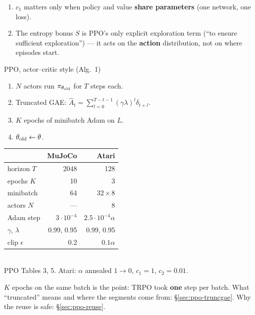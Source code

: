 \begin{enumerate}
  \item $c_1$ matters only when policy and value \textbf{share parameters} (one network, one loss).
  \item The entropy bonus $S$ is PPO's only explicit exploration term (``to ensure sufficient exploration'') --- it acts on the \textbf{action} distribution, not on where episodes start.
\end{enumerate}

\begin{minipage}[t]{0.56\linewidth}
\begin{algbox}{PPO, actor--critic style (Alg.~1)}
\begin{enumerate}
  \item $N$ actors run $\pi_{\theta_{\mathrm{old}}}$ for $T$ steps each.
  \item Truncated GAE: $\hat A_t = \sum_{l=0}^{T-t-1}(\gamma\lambda)^l\delta_{t+l}$.
  \item $K$ epochs of minibatch Adam on $L$.
  \item $\theta_{\mathrm{old}}\leftarrow\theta$.
\end{enumerate}
\end{algbox}
\end{minipage}\hfill
\begin{minipage}[t]{0.4\linewidth}
\small
\begin{tabular}{l r r}
\toprule
 & \textbf{MuJoCo} & \textbf{Atari} \\
\midrule
horizon $T$ & 2048 & 128 \\
epochs $K$ & 10 & 3 \\
minibatch & 64 & $32\times8$ \\
actors $N$ & --- & 8 \\
Adam step & $3\cdot10^{-4}$ & $2.5\cdot10^{-4}\alpha$ \\
$\gamma$, $\lambda$ & 0.99, 0.95 & 0.99, 0.95 \\
clip $\epsilon$ & 0.2 & $0.1\alpha$ \\
\bottomrule
\end{tabular}\\[2pt]
{\scriptsize\color{NoteGray}PPO Tables 3, 5. Atari: $\alpha$ annealed $1\to0$, $c_1=1$, $c_2=0.01$.}
\end{minipage}

{\small $K$ epochs on the same batch is the point: TRPO took \textbf{one} step per batch. What ``truncated'' means and where the segments come from: \S\ref{sec:ppo-truncgae}. Why the reuse is safe: \S\ref{sec:ppo-reuse}.}

